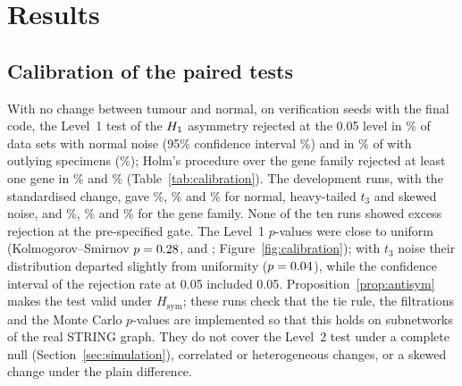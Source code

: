 \section{Results}\label{sec:results}

\subsection{Calibration of the paired tests}\label{sec:res-cal}
With no change between tumour and normal, on verification seeds with the final code, the Level~1 test of the $\Hone$ asymmetry rejected at the 0.05 level in \calNormalL\% of \calNormalN{} data sets with normal noise (95\% confidence interval \calNormalLci\%) and in \calOutliersL\% of \calOutliersN{} with outlying specimens (\calOutliersLci\%); Holm's procedure over the gene family rejected at least one gene in \calNormalG\% and \calOutliersG\% (Table~\ref{tab:calibration}). The development runs, with the standardised change, gave \calDevNormalL\%, \calTthreeL\% and \calSkewedL\% for normal, heavy-tailed $t_3$ and skewed noise, and \calDevNormalG\%, \calTthreeG\% and \calSkewedG\% for the gene family. None of the ten runs showed excess rejection at the pre-specified gate. The Level~1 $p$-values were close to uniform (Kolmogorov--Smirnov $p=0.28$, \calOutliersKS{} and \calSkewedKS; Figure~\ref{fig:calibration}); with $t_3$ noise their distribution departed slightly from uniformity ($p=0.04$), while the confidence interval of the rejection rate at 0.05 included 0.05. Proposition~\ref{prop:antisym} makes the test valid under $H_{\mathrm{sym}}$; these runs check that the tie rule, the filtrations and the Monte Carlo $p$-values are implemented so that this holds on subnetworks of the real STRING graph. They do not cover the Level~2 test under a complete null (Section~\ref{sec:simulation}), correlated or heterogeneous changes, or a skewed change under the plain difference.

\begin{table}[t]
\centering\small
\caption{Calibration under the null hypothesis: share of data sets rejected at the 0.05 level, with exact binomial 95\% confidence intervals. 800-gene STRING subnetworks, 78 patients, one layer. Change: plain difference \eqref{eq:delta} or the standardised change. Level 1: sign-flip test of the $\Hone$ asymmetry $A_i$ ($B=9{,}999$). Gene family: at least one gene rejected after Holm over all genes with a non-zero score in at least 10 patients.}
\label{tab:calibration}

\end{table}

